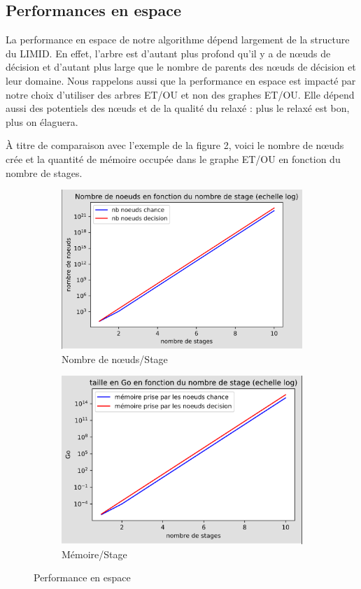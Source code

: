 \documentclass[12pt]{article}
\begin{document}
\subsection{Performances en espace}
La performance en espace de notre algorithme dépend largement de la structure du LIMID. 
En effet, l'arbre est d'autant plus profond qu'il y a de nœuds de décision et d'autant plus large que le nombre de parents des nœuds de décision et leur domaine. Nous rappelons aussi que la performance en espace est impacté par notre choix d'utiliser des arbres ET/OU et non des graphes ET/OU. Elle dépend aussi des potentiels des nœuds et de la qualité du relaxé : plus le relaxé est bon, plus on élaguera. 

À titre de comparaison avec l'exemple de la figure 2, voici le nombre de nœuds crée et la quantité de mémoire occupée dans le graphe ET/OU en fonction du nombre de stages.

\begin{figure}[ht]
\centering
\begin{subfigure}{.5\textwidth}
  \centering
  \includegraphics[width=.65\linewidth]{docs/ressources_rapport/perf_espace.png}
  \caption{Nombre de nœuds/Stage}
  \label{fig:sub8}
\end{subfigure}%
\begin{subfigure}{.5\textwidth}
  \centering
  \includegraphics[width=.65\linewidth]{docs/ressources_rapport/perf_Go.png}
  \caption{Mémoire/Stage}
  \label{fig:sub9}
\end{subfigure}
\caption{Performance en espace}
\label{fig:test4}
\end{figure}
\end{document}
